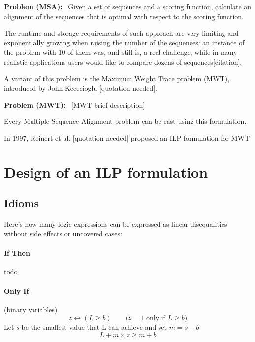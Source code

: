 \textbf{Problem (MSA):} \, Given a set of sequences and a scoring function, calculate an alignment of the sequences that is optimal with respect to the scoring function.

The runtime and storage requirements of such approach are very limiting and exponentially growing when raising the number of the sequences: an instance of the problem with 10 of them was, and still is, a real challenge, while in many realistic applications users would like to compare dozens of sequences[citation].

A variant of this problem is the Maximum Weight Trace problem (MWT), introduced by John Kececioglu [quotation needed].

\textbf{Problem (MWT):} \, [MWT brief description]


Every Multiple Sequence Alignment problem can be cast using this formulation.

In 1997, Reinert et al. [quotation needed] proposed an ILP formulation for MWT

\section{Design of an ILP formulation}

\subsection{Idioms}

Here's how many logic expressions can be expressed as linear disequalities without side effects or uncovered cases:

\paragraph{If Then}
todo

\paragraph{Only If} (binary variables)
$$z \leftrightarrow (L \geq b) \qquad \text{($z = 1$ only if $L \geq b$)}$$
Let \textit{s} be the smallest value that L can achieve and set $m = s - b$
$$ L + m \times z \geq m + b$$

